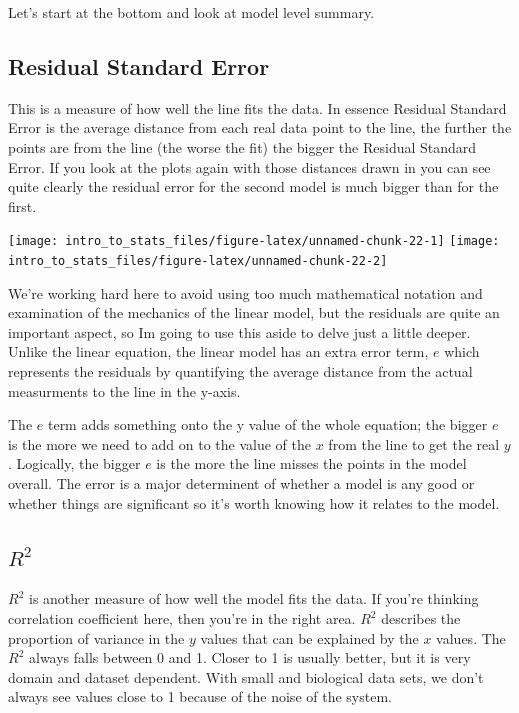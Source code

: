 \documentclass[
]{book}
\newenvironment{sidenote}
{ \begin{tcolorbox}[colbacktitle=blue!50!white,
title=huh?,coltitle=white,
fonttitle=\bfseries] }
{  \end{tcolorbox} }
\begin{document}
Let's start at the bottom and look at model level summary.

\hypertarget{residual-standard-error}{%
\subsection{Residual Standard Error}\label{residual-standard-error}}

This is a measure of how well the line fits the data. In essence Residual Standard Error is the average distance from each real data point to the line, the further the points are from the line (the worse the fit) the bigger the Residual Standard Error. If you look at the plots again with those distances drawn in you can see quite clearly the residual error for the second model is much bigger than for the first.

\texttt{[image: intro\_to\_stats\_files/figure-latex/unnamed-chunk-22-1]} \texttt{[image: intro\_to\_stats\_files/figure-latex/unnamed-chunk-22-2]}

\begin{sidenote}
We're working hard here to avoid using too much mathematical notation and examination of the mechanics of the linear model, but the residuals are quite an important aspect, so Im going to use this aside to delve just a little deeper. Unlike the linear equation, the linear model has an extra error term, \(e\) which represents the residuals by quantifying the average distance from the actual measurments to the line in the y-axis.

The \(e\) term adds something onto the y value of the whole equation; the bigger \(e\) is the more we need to add on to the value of the \(x\) from the line to get the real \(y\). Logically, the bigger \(e\) is the more the line misses the points in the model overall. The error is a major determinent of whether a model is any good or whether things are significant so it's worth knowing how it relates to the model.
\end{sidenote}

\hypertarget{r2}{%
\subsection{\texorpdfstring{\(R^2\)}{R\^{}2}}\label{r2}}

\(R^2\) is another measure of how well the model fits the data. If you're thinking correlation coefficient here, then you're in the right area. \(R^2\) describes the proportion of variance in the \(y\) values that can be explained by the \(x\) values. The \(R^2\) always falls between 0 and 1. Closer to 1 is usually better, but it is very domain and dataset dependent. With small and biological data sets, we don't always see values close to 1 because of the noise of the system.
\end{document}
